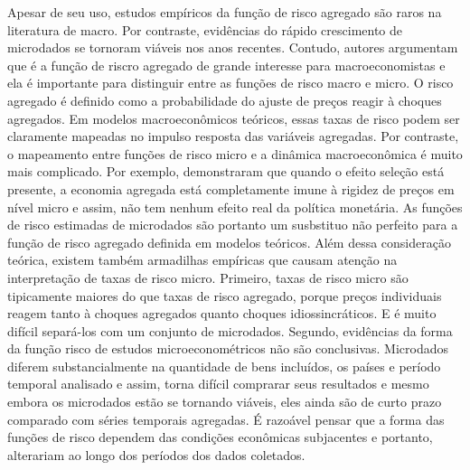 \documentclass[twoside,a4paper,11pt]{report}
\begin{document}
Apesar de seu uso, estudos empíricos da função de risco agregado são raros na literatura de macro. Por contraste, evidências do rápido crescimento de microdados se tornoram viáveis nos anos recentes. Contudo, autores argumentam que é a função de riscro agregado de grande interesse para macroeconomistas e ela é importante para distinguir entre as funções de risco macro e micro. O risco agregado é definido como a probabilidade do ajuste de preços reagir à choques agregados. Em modelos macroeconômicos teóricos, essas taxas de risco podem ser claramente mapeadas no impulso resposta das variáveis agregadas. Por contraste, o mapeamento entre funções de risco micro e a dinâmica macroeconômica é muito mais complicado. Por exemplo, \citet{caplin1987menu} demonstraram que quando o efeito seleção está presente, a economia agregada está completamente imune à rigidez de preços em nível micro e assim, não tem nenhum efeito real da política monetária. As funções de risco estimadas de microdados são portanto um susbstituo não perfeito para a função de risco agregado definida em modelos teóricos. Além dessa consideração teórica, existem também armadilhas empíricas que causam atenção na interpretação de taxas de risco micro. Primeiro, taxas de risco micro são tipicamente maiores do que taxas de risco agregado, porque preços individuais reagem tanto à choques agregados quanto choques idiossincráticos. E é muito difícil separá-los com um conjunto de microdados. Segundo, evidências da forma da função risco de estudos microeconométricos não são conclusivas. Microdados diferem substancialmente na quantidade de bens incluídos, os países e período temporal analisado e assim, torna difícil comprarar seus resultados e mesmo embora os microdados estão se tornando viáveis, eles ainda são de curto prazo comparado com séries temporais agregadas. É razoável pensar que a forma das funções de risco dependem das condições econômicas subjacentes e portanto, alterariam ao longo dos períodos dos dados coletados. 
\end{document}
